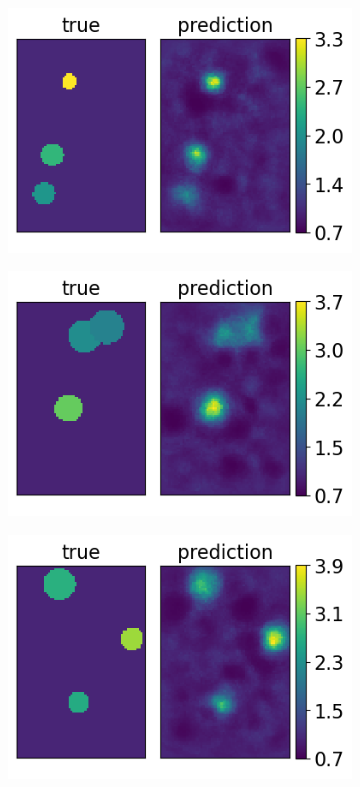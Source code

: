 \documentclass[12pt]{article}
\newcommand{\nhgappwidth}{0.24\linewidth}
\newcommand{\nhgappheight}{2.9cm}
\begin{document}
\begin{appendices}
\begin{figure}[!h]
\begin{subfigure}[c]{\nhgappwidth}
  \end{subfigure}
  \begin{subfigure}[c]{\nhgappwidth}
    \centering
    \includegraphics[totalheight=\nhgappheight]{Figures/AppendixNew/CNN3/ex7/mu.png}
  \end{subfigure}
  \begin{subfigure}[c]{\nhgappwidth}
    \centering
    \includegraphics[totalheight=\nhgappheight]{Figures/AppendixNew/CNN3/ex8/mu.png}
  \end{subfigure}
    \begin{subfigure}[c]{\nhgappwidth}
    \centering    
    \includegraphics[totalheight=\nhgappheight]{Figures/AppendixNew/CNN3/ex9/mu.png}

\end{subfigure}
\end{figure}
\end{appendices}
\end{document}
